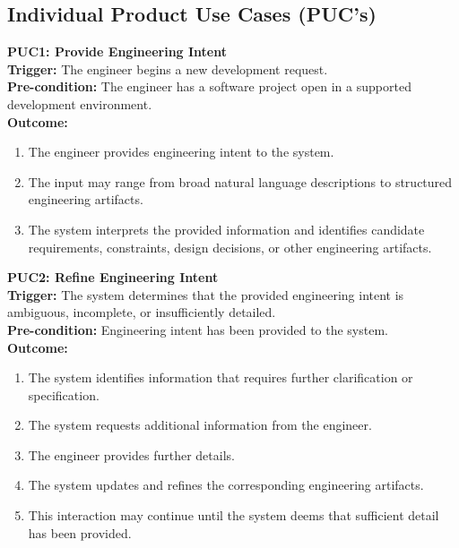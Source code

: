 \documentclass[12pt]{article}
\begin{document}
\subsection{Individual Product Use Cases (PUC's)}

\noindent\textbf{PUC1: Provide Engineering Intent}\\
\textbf{Trigger:} The engineer begins a new development request.\\
\textbf{Pre-condition:} The engineer has a software project open in a supported development environment.\\
\textbf{Outcome:}
\begin{enumerate}
    \item The engineer provides engineering intent to the system.
    \item The input may range from broad natural language descriptions to structured engineering artifacts.
    \item The system interprets the provided information and identifies candidate requirements, constraints, design decisions, or other engineering artifacts.
\end{enumerate}

\noindent\textbf{PUC2: Refine Engineering Intent}\\
\textbf{Trigger:} The system determines that the provided engineering intent is ambiguous, incomplete, or insufficiently detailed.\\
\textbf{Pre-condition:} Engineering intent has been provided to the system.\\
\textbf{Outcome:}
\begin{enumerate}
    \item The system identifies information that requires further clarification or specification.
    \item The system requests additional information from the engineer.
    \item The engineer provides further details.
    \item The system updates and refines the corresponding engineering artifacts.
    \item This interaction may continue until the system deems that sufficient detail has been provided.
\end{enumerate}
\end{document}
